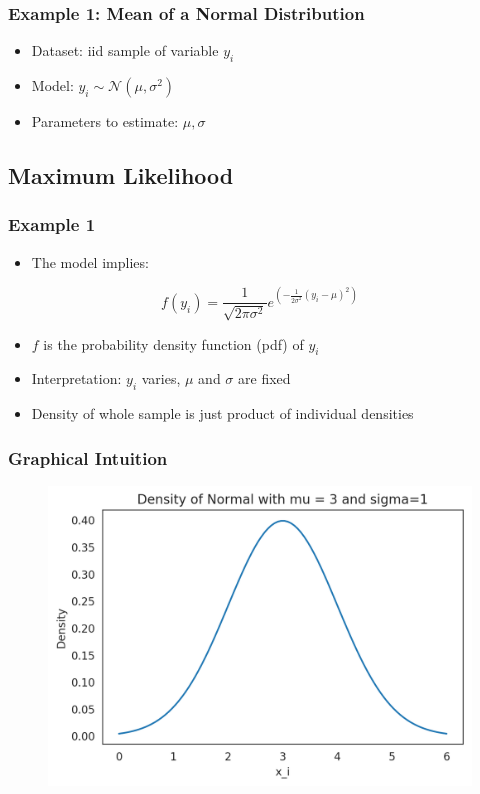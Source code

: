 \documentclass[11pt]{beamer}
\begin{document}
\begin{frame}[c]\frametitle{Example 1: Mean of a Normal Distribution}
    \begin{itemize}
        \item Dataset: iid sample of variable $y_i$
        \item Model: $y_i \sim \mathcal{N}(\mu, \sigma^2)$
        \item Parameters to estimate: $\mu, \sigma$
    \end{itemize}
\end{frame}


\subsection{Maximum Likelihood}

\begin{frame}[c]\frametitle{Example 1}
    \begin{itemize}
        \item The model implies:
    \end{itemize}

    \begin{equation}
        f(y_i) = \frac{1}{\sqrt{2\pi\sigma^2}} e^{\left(-\frac{1}{2 \sigma^2}(y_i - \mu)^2\right)}
    \end{equation}

    \begin{itemize}
        \item $f$ is the probability density function (pdf) of $y_i$
        \item Interpretation: $y_i$ varies, $\mu$ and $\sigma$ are fixed
        \item Density of whole sample is just product of individual densities
    \end{itemize}
\end{frame}


\begin{frame}[c]\frametitle{Graphical Intuition}
    \begin{figure}
        \includegraphics[width=\textwidth]{figures/normal_density.png}
    \end{figure}
\end{frame}
\end{document}
